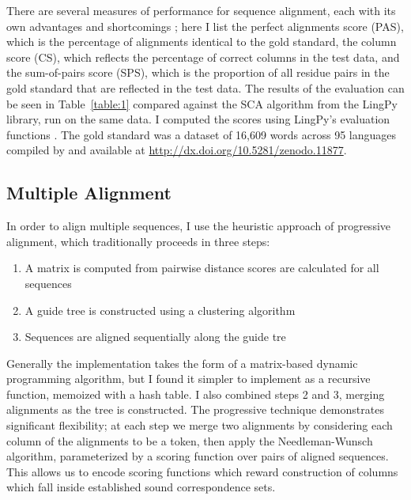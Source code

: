 \documentclass[doc,natbib,12pt]{apa6}
\begin{document}
There are several measures of performance for sequence alignment, each with its own advantages and shortcomings \citep{List2012b}; here I list the perfect alignments score (PAS), which is the percentage of alignments identical to the gold standard, the column score (CS), which reflects the percentage of correct columns in the test data, and the sum-of-pairs score (SPS), which is the proportion of all residue pairs in the gold standard that are reflected in the test data. The results of the evaluation can be seen in Table~\ref{table:1} compared against the SCA algorithm from the LingPy library, run on the same data. I computed the scores using LingPy's evaluation functions \citep{List2016}. The gold standard was a dataset of 16,609 words across 95 languages compiled by \citet{List2014} and available at \url{http://dx.doi.org/10.5281/zenodo.11877}.
\begin{table}[h]
\end{table}

\subsection{Multiple Alignment}

In order to align multiple sequences, I use the heuristic approach of progressive alignment, which traditionally proceeds in three steps: \begin{enumerate}
	\item A matrix is computed from pairwise distance scores are calculated for all sequences
	\item A guide tree is constructed using a clustering algorithm 
	\item Sequences are aligned sequentially along the guide tre
\end{enumerate}

Generally the implementation takes the form of a matrix-based dynamic programming algorithm, but I found it simpler to implement as a recursive function, memoized with a hash table. I also combined steps 2 and 3, merging alignments as the tree is constructed. The progressive technique demonstrates significant flexibility; at each step we merge two alignments by considering each column of the alignments to be a token, then apply the Needleman-Wunsch algorithm, parameterized by a scoring function over pairs of aligned sequences. This allows us to encode scoring functions which reward construction of columns which fall inside established sound correspondence sets. 
\end{document}
